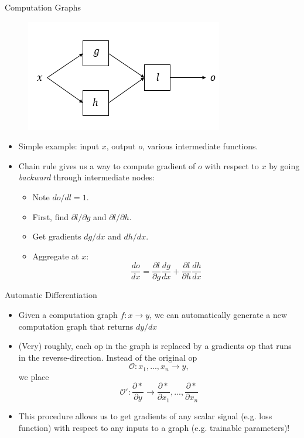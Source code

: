 \documentclass[]{beamer}
\begin{document}
\begin{frame}{Computation Graphs}

\begin{figure}
  \centering
  \includegraphics[width=0.4\linewidth]{graph2.png}
\end{figure}
\begin{itemize}
\item Simple example: input $x$, output $o$, various intermediate functions.
\item Chain rule gives us a way to compute gradient of $o$ with respect to $x$ by going \textit{backward} through intermediate nodes:
\begin{itemize}
\item Note $do/dl = 1$. 
\item First, find $\partial l / \partial g$ and $\partial l / \partial h$. 
\item Get gradients  $d g / d x$ and $d h / d x$.
\item Aggregate at $x$:
\begin{equation*}
\frac{d o}{dx} = \frac{\partial l}{\partial g} \frac{d g}{d x} + \frac{\partial l}{\partial h} \frac{dh}{dx}
\end{equation*} 
\end{itemize}
\end{itemize}

\end{frame}

\begin{frame}{Automatic Differentiation}

\begin{itemize}
\item Given a computation graph $f : x \to y$, we can automatically generate a new computation graph that returns $dy/dx$
\item (Very) roughly, each op in the graph is replaced by a gradients op that runs in the reverse-direction. Instead of the original op
%
\begin{equation*}
\mathcal{O} : x_1, ..., x_n \to y,
\end{equation*}
%
we place
%
\begin{equation*}
\mathcal{O}' : \frac{\partial *}{\partial y} \to \frac{\partial *}{\partial x_1}, ..., \frac{\partial *}{\partial x_n}
\end{equation*}
\item This procedure allows us to get gradients of any scalar signal (e.g. loss function) with respect to any inputs to a graph (e.g. trainable parameters)!
\end{itemize}
\end{frame}
\end{document}
